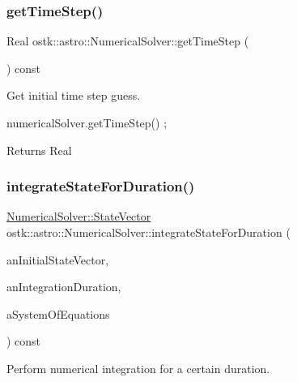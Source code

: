 \subsubsection{\texorpdfstring{get\+Time\+Step()}{getTimeStep()}}
{\footnotesize\ttfamily Real ostk\+::astro\+::\+Numerical\+Solver\+::get\+Time\+Step (\begin{DoxyParamCaption}{ }\end{DoxyParamCaption}) const}



Get initial time step guess. 


\begin{DoxyCode}
numericalSolver.getTimeStep() ;
\end{DoxyCode}


\begin{DoxyReturn}{Returns}
Real 
\end{DoxyReturn}
\mbox{\label{classostk_1_1astro_1_1_numerical_solver_a20b6bec03702bbe76e919a4a3fbf6cd9}} 
\subsubsection{\texorpdfstring{integrate\+State\+For\+Duration()}{integrateStateForDuration()}}
{\footnotesize\ttfamily \hyperlink{classostk_1_1astro_1_1_numerical_solver_a4a1673a6f74a72d6bacfe6480b9c1ccd}{Numerical\+Solver\+::\+State\+Vector} ostk\+::astro\+::\+Numerical\+Solver\+::integrate\+State\+For\+Duration (\begin{DoxyParamCaption}\item[{const \hyperlink{classostk_1_1astro_1_1_numerical_solver_a4a1673a6f74a72d6bacfe6480b9c1ccd}{State\+Vector} \&}]{an\+Initial\+State\+Vector,  }\item[{const Duration \&}]{an\+Integration\+Duration,  }\item[{const \hyperlink{classostk_1_1astro_1_1_numerical_solver_aa39593aa5ff747e4f68492708b45bbc5}{System\+Of\+Equations\+Wrapper} \&}]{a\+System\+Of\+Equations }\end{DoxyParamCaption}) const}



Perform numerical integration for a certain duration. 


